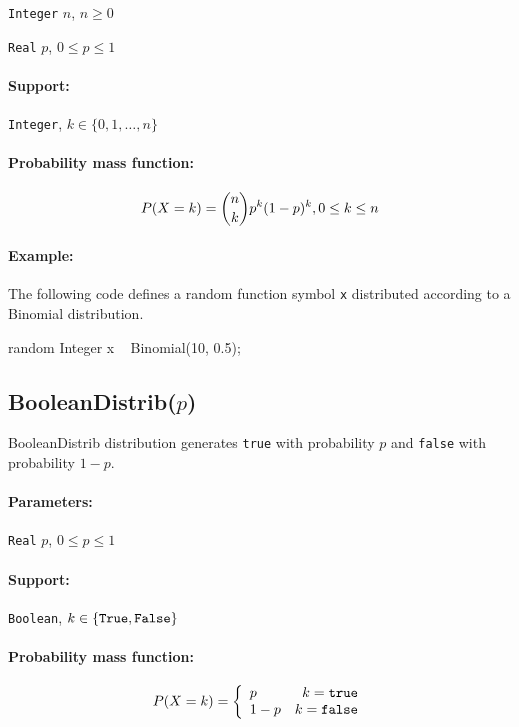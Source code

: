 \begin{itemize*}
\item[] \verb|Integer| $n$, $n \geq 0$
\item[] \verb|Real| $p$, $0 \leq p \leq 1$
\end{itemize*}

\paragraph*{Support:} \verb|Integer|, $k \in \{0, 1, \ldots, n\} $

\paragraph*{Probability mass function:}
\[
	P(X = k) = \binom{n}{k}p^{k}(1-p)^{k} , 0 \leq k \leq n \\
\]

\paragraph*{Example:}
The following code defines a random function symbol \verb|x| distributed according to a Binomial distribution.
\begin{blogcode}
random Integer x ~ Binomial(10, 0.5);
\end{blogcode}

\subsection{BooleanDistrib($p$)} \label{boolean-distribution-section}
BooleanDistrib distribution generates \verb|true| with probability $p$ and \verb|false| with probability $1-p$. 

\paragraph*{Parameters:} 
\begin{itemize*}
\item[] \verb|Real|
 $p$, $0 \leq p \leq 1$ 
\end{itemize*}
\paragraph*{Support:} \verb|Boolean|, $k \in \{\verb|True|, \verb|False|\}$ 

\paragraph*{Probability mass function:}
\[
	P(X = k) = \left\{
	  \begin{array}{lr}
	    p & k = \verb|true| \\
	    1 - p & k = \verb|false|
	  \end{array}
	\right.
\]

